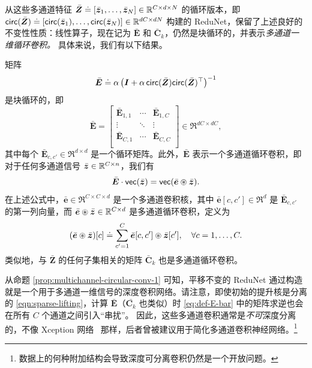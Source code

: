 \documentclass[../../book-main.tex]{subfiles}
\begin{document}
从这些多通道特征 $\bar{\bm{Z}} \doteq [\bar {\bm{z}}_1, \ldots, \bar {\bm{z}}_N] \in \mathbb{R}^{C \times d \times N}$ 的循环版本，即 $\mathsf{circ}(\bar{\bm{Z}}) \doteq [ \mathsf{circ}(\bar{\bm{z}}_1), \dots, \mathsf{circ}(\bar{\bm{z}}_N)] \in \mathbb{R}^{dC \times dN}$ 构建的 ReduNet，保留了上述良好的不变性性质：线性算子，现在记为 $\bar{\bm E}$ 和 $\bar{\bm C}_k$，仍然是块循环的，并表示{\em 多通道一维循环卷积。}
具体来说，我们有以下结果。
\begin{proposition}
矩阵
\begin{equation}
\label{eq:def-E-bar}
\bar{\bm E} \doteq \alpha\left(\bm I + \alpha\, \mathsf{circ}(\bar{\bm{Z}}) \mathsf{circ}(\bar{\bm{Z}})^\top \right) ^{-1}
\end{equation}
是块循环的，即
\begin{equation*}
    \bar{\bm E} =
    \left[\begin{matrix}
        \bar{\bm E}_{1, 1} & \cdots & \bar{\bm E}_{1, C}\\
        \vdots & \ddots & \vdots \\
        \bar{\bm E}_{C, 1} & \cdots & \bar{\bm E}_{C, C}\\
    \end{matrix}\right] \in \Re^{dC \times dC},
\end{equation*}
其中每个 $\bar{\bm E}_{c, c'}\in \Re^{d \times d}$ 是一个循环矩阵。此外，$\bar{\bm E}$ 表示一个多通道循环卷积，即对于任何多通道信号 $\bar{\bm{z}} \in \mathbb{R}^{C \times n}$，我们有
$$\bar{\bm E} \cdot \textsf{vec}(\bar{\bm{z}}) = \textsf{vec}( \bar{\bm e} \circledast \bar{\bm{z}}).$$
在上述公式中，$\bar{\bm e} \in \Re^{C \times C \times d}$ 是一个多通道卷积核，其中 $\bar{\bm e}[c, c'] \in \Re^{d}$ 是 $\bar{\bm E}_{c, c'}$ 的第一列向量，而 $\bar{\bm e} \circledast \bar{\bm{z}} \in \mathbb{R}^{C \times d}$ 是多通道循环卷积，定义为
\begin{equation*}
    (\bar{\bm e} \circledast \bar{\bm{z}})[c] \doteq \sum_{c'=1}^C \bar{\bm e}[c, c'] \circledast \bar{\bm{z}}[c'], \quad \forall c = 1, \ldots, C.
\end{equation*}
类似地，与 $\bar{\bm Z}$ 的任何子集相关的矩阵 $\bar{\bm C}_k$ 也是多通道循环卷积。
\label{prop:multichannel-circular-conv-1}
\end{proposition}
从命题 \ref{prop:multichannel-circular-conv-1} 可知，平移不变的 ReduNet 通过构造就是一个用于多通道一维信号的深度卷积网络。请注意，即使初始的提升核是分离的 \eqref{eqn:sparse-lifting}，计算 $\bar{\bm E}$（$\bar{\bm C_k}$ 也类似）时 \eqref{eq:def-E-bar} 中的矩阵求逆也会在所有 $C$ 个通道之间引入“串扰”。%
因此，这些多通道卷积通常是{\em 不可}深度分离的，不像 Xception 网络~\cite{Xception} 那样，后者曾被建议用于简化多通道卷积神经网络。\footnote{数据上的何种附加结构会导致深度可分离卷积仍然是一个开放问题。}
\end{document}
